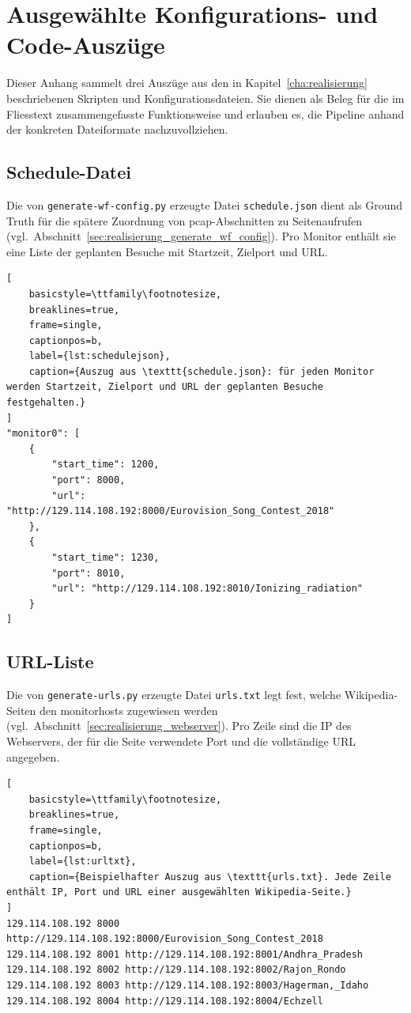 \chapter{Ausgewählte Konfigurations- und Code-Auszüge}
\label{app:listings}

Dieser Anhang sammelt drei Auszüge aus den in Kapitel~\ref{cha:realisierung} beschriebenen Skripten und Konfigurationsdateien.
Sie dienen als Beleg für die im Fliesstext zusammengefasste Funktionsweise und erlauben es, die Pipeline anhand der konkreten Dateiformate nachzuvollziehen.

\section{Schedule-Datei}
\label{app:listing_schedule}

Die von \texttt{generate-wf-config.py} erzeugte Datei \texttt{schedule.json} dient als Ground Truth für die spätere Zuordnung von \gls{pcap}-Abschnitten zu Seitenaufrufen (vgl.\ Abschnitt~\ref{sec:realisierung_generate_wf_config}).
Pro Monitor enthält sie eine Liste der geplanten Besuche mit Startzeit, Zielport und URL.

\begin{lstlisting}[
    basicstyle=\ttfamily\footnotesize,
    breaklines=true,
    frame=single,
    captionpos=b,
    label={lst:schedulejson},
    caption={Auszug aus \texttt{schedule.json}: für jeden Monitor werden Startzeit, Zielport und URL der geplanten Besuche festgehalten.}
]
"monitor0": [
    {
        "start_time": 1200,
        "port": 8000,
        "url": "http://129.114.108.192:8000/Eurovision_Song_Contest_2018"
    },
    {
        "start_time": 1230,
        "port": 8010,
        "url": "http://129.114.108.192:8010/Ionizing_radiation"
    }
]
\end{lstlisting}

\section{URL-Liste}
\label{app:listing_urls}

Die von \texttt{generate-urls.py} erzeugte Datei \texttt{urls.txt} legt fest, welche Wikipedia-Seiten den \gls{monitorhost}s zugewiesen werden (vgl.\ Abschnitt~\ref{sec:realisierung_webserver}).
Pro Zeile sind die IP des Webservers, der für die Seite verwendete Port und die vollständige URL angegeben.

\begin{lstlisting}[
    basicstyle=\ttfamily\footnotesize,
    breaklines=true,
    frame=single,
    captionpos=b,
    label={lst:urltxt},
    caption={Beispielhafter Auszug aus \texttt{urls.txt}. Jede Zeile enthält IP, Port und URL einer ausgewählten Wikipedia-Seite.}
]
129.114.108.192 8000 http://129.114.108.192:8000/Eurovision_Song_Contest_2018
129.114.108.192 8001 http://129.114.108.192:8001/Andhra_Pradesh
129.114.108.192 8002 http://129.114.108.192:8002/Rajon_Rondo
129.114.108.192 8003 http://129.114.108.192:8003/Hagerman,_Idaho
129.114.108.192 8004 http://129.114.108.192:8004/Echzell
\end{lstlisting}


